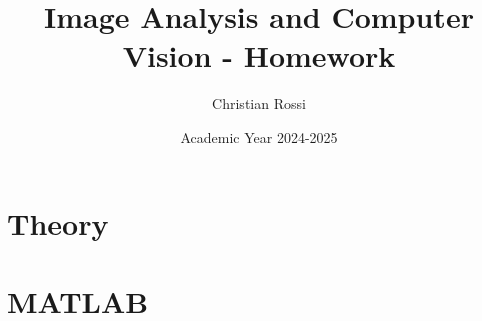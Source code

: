 \documentclass[12pt, a4paper]{report}
\title{\textbf{Image Analysis and Computer Vision - Homework}}
\author{Christian Rossi}
\date{Academic Year 2024-2025}
\begin{document}
    \maketitle


    \cleardoublepage

    \tableofcontents

    \cleardoublepage

    \chapter{Theory}
    
    
    
    
    
    

    \chapter{MATLAB}
    
    
    
\end{document}
